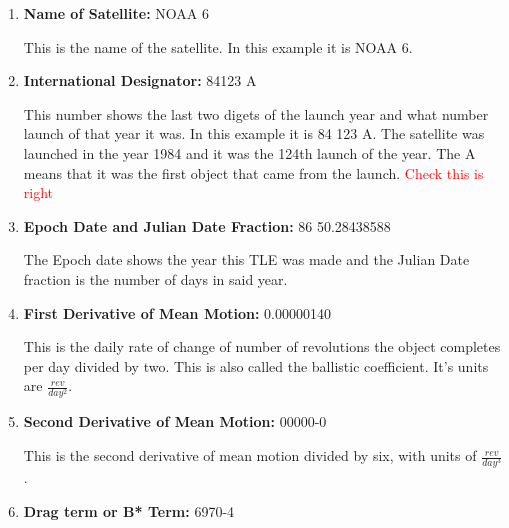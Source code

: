\documentclass[12pt]{article}
\begin{document}
	\begin{enumerate}
		\item \textbf{Name of Satellite:} NOAA 6
		
		This is the name of the satellite. In this example it is NOAA 6.
		\item 	\textbf{International Designator:} 84123 A
		
		This number shows the last two digets of the launch year and what number launch of that year it was. In this example it is 84 123 A. The satellite was launched in the year 1984 and it was the 124th launch of the year. The A means that it was the first object that came from the launch. \textcolor{red}{Check this is right}
		
		\item \textbf{Epoch Date and Julian Date Fraction:} 86 50.28438588
		
		The Epoch date shows the year this TLE was made and the Julian Date fraction is the number of days in said year. 
		
		\item \textbf{First Derivative of Mean Motion:} 0.00000140
		
		This is the daily rate of change of number of revolutions the object completes per day divided by two. This is also called the ballistic coefficient.\cite{NASATLE} It's units are $\frac{rev}{day^2}$. 
		
		\item \textbf{Second Derivative of Mean Motion:} 00000-0
		
		This is the second derivative of mean motion divided by six, with units of $\frac{rev}{day^3}$.
		
		\item \textbf{Drag term or B* Term: }6970-4
		

\end{enumerate}
\end{document}
